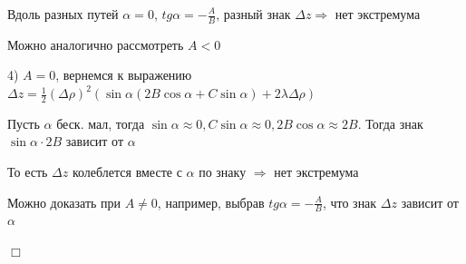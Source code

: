 \documentclass[12pt]{article}
\begin{document}
    Вдоль разных путей $\alpha = 0$, $tg \alpha = -\frac{A}{B}$, разный знак $\Delta z \Longrightarrow$ нет экстремума

    \Nota Можно аналогично рассмотреть $A < 0$

    4) $A = 0$, вернемся к выражению $\Delta z = \frac{1}{2} (\Delta \rho)^2 (\sin\alpha(2B\cos\alpha + C\sin\alpha) + 2\lambda\Delta\rho)$

    Пусть $\alpha$ беск. мал, тогда $\sin\alpha \approx 0, C\sin\alpha \approx 0, 2B\cos\alpha \approx 2B$. Тогда знак $\sin\alpha \cdot 2B$ зависит от $\alpha$

    То есть $\Delta z$ колеблется вместе с $\alpha$ по знаку $\Longrightarrow$ нет экстремума

    Можно доказать при $A \neq 0$, например, выбрав $tg \alpha = -\frac{A}{B}$, что знак $\Delta z$ зависит от $\alpha$

    $\Box$
\end{document}

